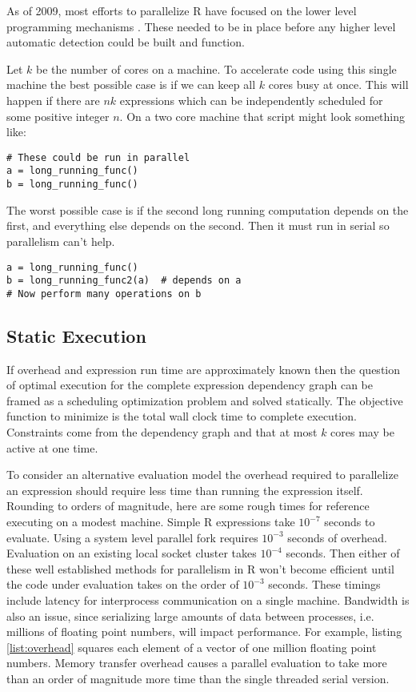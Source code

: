 \documentclass[12pt]{article}
\begin{document}
As of 2009, most efforts to parallelize R have focused on the lower level
programming mechanisms \cite{schmidberger2009state}. These needed to be in
place before any higher level automatic detection could be built and
function.

Let $k$ be the number of cores on a machine.
To accelerate code using this single machine the best possible case is if
we can keep all $k$ cores busy at once. This will happen if there are $nk$
expressions which can be independently scheduled for some positive integer
$n$. 
On a two core machine that script might look something like:

\begin{verbatim}
# These could be run in parallel
a = long_running_func()
b = long_running_func()
\end{verbatim}

The worst possible case is if the second long running computation depends
on the first, and everything else depends on the second. Then it must run
in serial so parallelism can't help.

\begin{verbatim}
a = long_running_func()
b = long_running_func2(a)  # depends on a
# Now perform many operations on b
\end{verbatim}

\subsection{Static Execution}
\label{sec:static}

If overhead and expression run time are approximately known then the
question of optimal execution for the complete expression dependency graph
can be framed as a scheduling optimization problem and solved statically.
The objective function to minimize is the total wall clock time to complete
execution. Constraints come from the dependency graph and that at most $k$
cores may be active at one time.

To consider an alternative evaluation model the overhead required to
parallelize an expression should require less time than running the
expression itself. Rounding to orders of magnitude, here are some rough
times for reference executing on a modest machine. Simple R expressions
take $10^{-7}$ seconds to evaluate. Using a system level parallel fork
requires $10^{-3}$ seconds of overhead. Evaluation on an existing local
socket cluster takes $10^{-4}$ seconds. Then either of these well
established methods for parallelism in R won't become efficient until the
code under evaluation takes on the order of $10^{-3}$ seconds.
These timings include latency for interprocess communication on a single
machine. Bandwidth is also an issue, since serializing large amounts of
data between processes, i.e. millions of floating point numbers, will impact
performance. For example, listing \ref{list:overhead} squares each element
of a vector of one million floating point numbers. Memory transfer overhead causes
a parallel evaluation to take more than an order of magnitude more time
than the single threaded serial version. 
\end{document}
